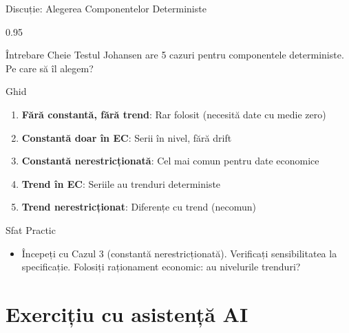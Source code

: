 \documentclass[9pt, aspectratio=169, t]{beamer}
\begin{document}
\begin{frame}{Discuție: Alegerea Componentelor Deterministe}
    \begin{cminipage}{0.95\textwidth}
    {\small
    \begin{alertblock}{Întrebare Cheie}
        Testul Johansen are 5 cazuri pentru componentele deterministe. Pe care să îl alegem?
    \end{alertblock}
    \begin{block}{Ghid}
        \begin{enumerate}\setlength{\itemsep}{0pt}
            \item \textbf{Fără constantă, fără trend}: Rar folosit (necesită date cu medie zero)
            \item \textbf{Constantă doar în EC}: Serii în nivel, fără drift
            \item \textbf{Constantă nerestricționată}: Cel mai comun pentru date economice
            \item \textbf{Trend în EC}: Seriile au trenduri deterministe
            \item \textbf{Trend nerestricționat}: Diferențe cu trend (necomun)
        \end{enumerate}
    \end{block}
    \begin{exampleblock}{Sfat Practic}
        \begin{itemize}\setlength{\itemsep}{0pt}
            \item Începeți cu Cazul 3 (constantă nerestricționată). Verificați sensibilitatea la specificație. Folosiți raționament economic: au nivelurile trenduri?
        \end{itemize}
    \end{exampleblock}
    }
    \end{cminipage}
\end{frame}

\section{Exercițiu cu asistență AI}
\end{document}
